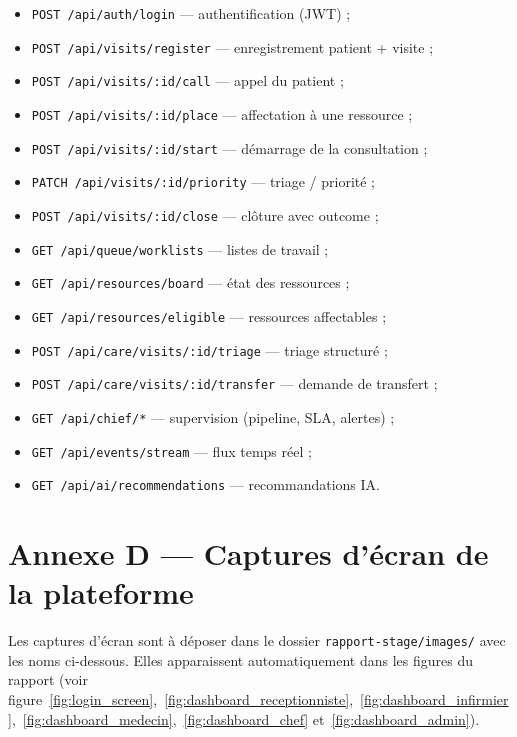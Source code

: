 \begin{itemize}
    \item \texttt{POST /api/auth/login} — authentification (JWT) ;
    \item \texttt{POST /api/visits/register} — enregistrement patient + visite ;
    \item \texttt{POST /api/visits/:id/call} — appel du patient ;
    \item \texttt{POST /api/visits/:id/place} — affectation à une ressource ;
    \item \texttt{POST /api/visits/:id/start} — démarrage de la consultation ;
    \item \texttt{PATCH /api/visits/:id/priority} — triage / priorité ;
    \item \texttt{POST /api/visits/:id/close} — clôture avec outcome ;
    \item \texttt{GET /api/queue/worklists} — listes de travail ;
    \item \texttt{GET /api/resources/board} — état des ressources ;
    \item \texttt{GET /api/resources/eligible} — ressources affectables ;
    \item \texttt{POST /api/care/visits/:id/triage} — triage structuré ;
    \item \texttt{POST /api/care/visits/:id/transfer} — demande de transfert ;
    \item \texttt{GET /api/chief/*} — supervision (pipeline, SLA, alertes) ;
    \item \texttt{GET /api/events/stream} — flux temps réel ;
    \item \texttt{GET /api/ai/recommendations} — recommandations IA.
\end{itemize}

\section{Annexe D — Captures d'écran de la plateforme}

Les captures d'écran sont à déposer dans le dossier \texttt{rapport-stage/images/} avec les noms ci-dessous. Elles apparaissent automatiquement dans les figures du rapport (voir figure~\ref{fig:login_screen},~\ref{fig:dashboard_receptionniste},~\ref{fig:dashboard_infirmier},~\ref{fig:dashboard_medecin},~\ref{fig:dashboard_chef} et~\ref{fig:dashboard_admin}).

